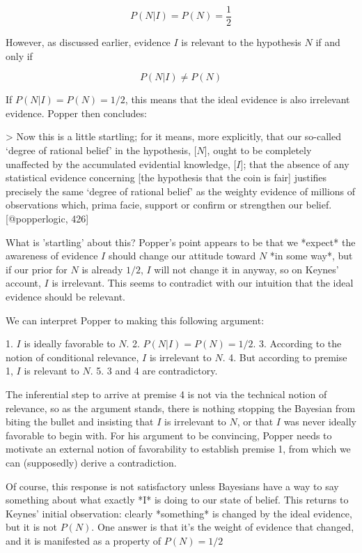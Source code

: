 \[P (N|I) = P(N) = \frac{1}{2}\]

However, as discussed earlier, evidence \(I\) is relevant to the
hypothesis \(N\) if and only if

\[P(N|I) \neq P(N)\]

If \(P(N|I) = P(N) = 1/2\), this means that the ideal evidence is also
irrelevant evidence. Popper then concludes:

\textgreater{} Now this is a little startling; for it means, more
explicitly, that our so-called `degree of rational belief' in the
hypothesis, {[}\(N\){]}, ought to be completely unaffected by the
accumulated evidential knowledge, {[}\(I\){]}; that the absence of any
statistical evidence concerning {[}the hypothesis that the coin is
fair{]} justifies precisely the same `degree of rational belief' as the
weighty evidence of millions of observations which, prima facie, support
or confirm or strengthen our belief. {[}@popperlogic, 426{]}

What is 'startling' about this? Popper's point appears to be that we
*expect* the awareness of evidence \(I\) should change our attitude
toward \(N\) *in some way*, but if our prior for \(N\) is already
\(1/2\), \(I\) will not change it in anyway, so on Keynes' account,
\(I\) is irrelevant. This seems to contradict with our intuition that
the ideal evidence should be relevant.

We can interpret Popper to making this following argument:

1. \(I\) is ideally favorable to \(N\). 2. \(P(N|I) = P(N) = 1/2\). 3.
According to the notion of conditional relevance, \(I\) is irrelevant to
\(N\). 4. But according to premise 1, \(I\) is relevant to \(N\). 5. 3
and 4 are contradictory.

The inferential step to arrive at premise 4 is not via the technical
notion of relevance, so as the argument stands, there is nothing
stopping the Bayesian from biting the bullet and insisting that \(I\) is
irrelevant to \(N\), or that \(I\) was never ideally favorable to begin
with. For his argument to be convincing, Popper needs to motivate an
external notion of favorability to establish premise 1, from which we
can (supposedly) derive a contradiction.

Of course, this response is not satisfactory unless Bayesians have a way
to say something about what exactly *I* is doing to our state of belief.
This returns to Keynes' initial observation: clearly *something* is
changed by the ideal evidence, but it is not \(P(N)\). One answer is
that it's the weight of evidence that changed, and it is manifested as a
property of \(P(N) = 1/2\)

